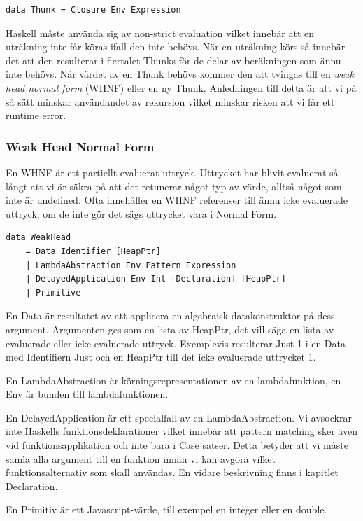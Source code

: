 \begin{lstlisting}
data Thunk = Closure Env Expression
\end{lstlisting}

Haskell måste använda sig av non-strict evaluation vilket innebär att en uträkning inte får köras ifall den inte behövs. När en uträkning körs så innebär det att den resulterar i flertalet Thunks för de delar av beräkningen som ännu inte behövs. När värdet av en Thunk behövs kommer den att tvingas till en \emph{weak head normal form} (WHNF) eller en ny Thunk. Anledningen till detta är att vi på så sätt minskar användandet av rekursion vilket minskar risken att vi får ett runtime error.

\subsubsection{Weak Head Normal Form}
En WHNF är ett partiellt evaluerat uttryck. Uttrycket har blivit evaluerat så långt att vi är säkra på att det retunerar något typ av värde, alltså något som inte är undefined. Ofta innehåller en WHNF referenser till ännu icke evaluerade uttryck, om de inte gör det sägs uttrycket vara i Normal Form.

\begin{lstlisting}
data WeakHead 
    = Data Identifier [HeapPtr]
    | LambdaAbstraction Env Pattern Expression
    | DelayedApplication Env Int [Declaration] [HeapPtr]
    | Primitive
\end{lstlisting}

En Data är resultatet av att applicera en algebraisk datakonstruktor på dess argument. Argumenten ges som en lista av HeapPtr, det vill säga en lista av evaluerade eller icke evaluerade uttryck. Exemplevis resulterar Just 1 i en Data med Identifiern Just och en HeapPtr till det icke evaluerade uttrycket 1.

En LambdaAbstraction är körningsrepresentationen av en lambdafunktion, en Env är bunden till lambdafunktionen.

En DelayedApplication är ett specialfall av en LambdaAbstraction. Vi avsockrar inte Haskells funktionsdeklarationer vilket innebär att pattern matching sker även vid funktionsapplikation och inte bara i Case satser. Detta betyder att vi måste samla alla argument till en funktion innan vi kan avgöra vilket funktionsalternativ som skall användas. En vidare beskrivning finns i kapitlet Declaration.

En Primitiv är ett Javascript-värde, till exempel en integer eller en double.

